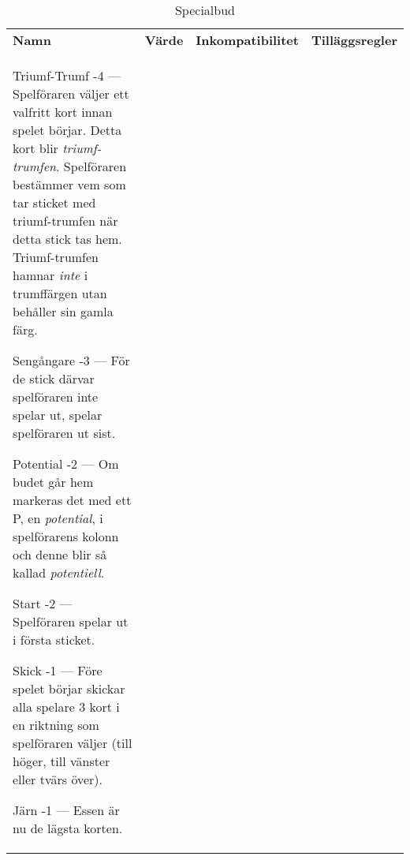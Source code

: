 %
%
%
%

\newcommand{\nonTrump}{\textnormal{icke-trumf-bud}}

\begin{table}
	\caption{Specialbud}\label{tab:specialBids}
	\begin{center}
		\begin{tabularx}{\textwidth}{
			l
			S[table-number-alignment=center, table-figures-decimal=0]
			p{3cm}
			|X
		}
			\textbf{Namn} &
			\textbf{Värde} &
			\textbf{Inkompatibilitet} &
			\textbf{Tilläggsregler}
			\\[-3ex]

			\specialBidItem%
			{Triumf-Trumf}
			{-4}
			{---}
			{%
				Spelföraren väljer ett valfritt kort innan spelet börjar. Detta kort blir \emph{triumf-trumfen}. Spelföraren bestämmer vem som tar sticket med triumf-trumfen när detta stick tas hem. Triumf-trumfen hamnar \emph{inte} i trumffärgen utan behåller sin gamla färg.
			}

			\specialBidItem%
			{Sengångare}
			{-3}
			{---}
			{%
				För de stick därvar spelföraren inte spelar ut, spelar spelföraren ut sist.
			}

			\specialBidItem%
			{Potential}
			{-2}
			{---}
			{%
				Om budet går hem markeras det med ett P, en \emph{potential}, i spelförarens kolonn och denne blir så kallad \emph{potentiell}.
			}

			\specialBidItem%
			{Start}
			{-2}
			{---}
			{%
				Spelföraren spelar ut i första sticket.
			}

			\specialBidItem%
			{Skick}
			{-1}
			{---}
			{%
				Före spelet börjar skickar alla spelare 3 kort i en riktning som spelföraren väljer (till höger, till vänster eller tvärs över).
			}

			\specialBidItem%
			{Järn}
			{-1}
			{---}
			{%
				Essen är nu de lägsta korten.
			}


\end{tabularx}
\end{center}
\end{table}
